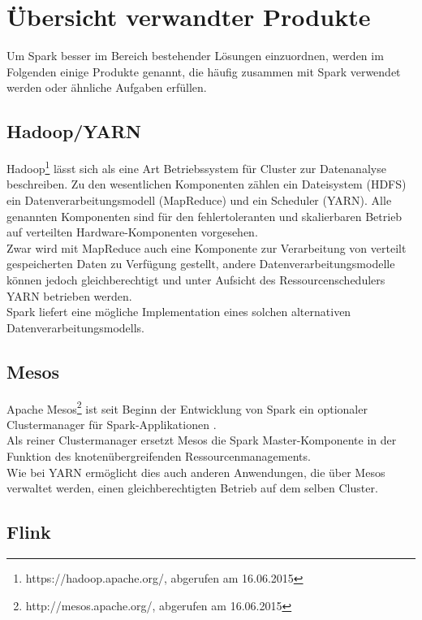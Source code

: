 \section{Übersicht verwandter Produkte}
Um Spark besser im Bereich bestehender Lösungen einzuordnen, werden im Folgenden einige Produkte genannt, die häufig zusammen mit Spark verwendet werden oder ähnliche Aufgaben erfüllen.

\subsection{Hadoop/YARN}

Hadoop\footnote{https://hadoop.apache.org/, abgerufen am 16.06.2015} lässt sich als eine Art Betriebssystem für Cluster zur Datenanalyse beschreiben. Zu den wesentlichen Komponenten zählen ein Dateisystem (HDFS) ein Datenverarbeitungsmodell (MapReduce) und ein Scheduler (YARN).
Alle genannten Komponenten sind für den fehlertoleranten und skalierbaren Betrieb auf verteilten Hardware-Komponenten vorgesehen.\\

Zwar wird mit MapReduce auch eine Komponente zur Verarbeitung von verteilt gespeicherten Daten zu Verfügung gestellt, andere Datenverarbeitungsmodelle können jedoch gleichberechtigt und unter Aufsicht des Ressourcenschedulers YARN betrieben werden.\\

Spark liefert eine mögliche Implementation eines solchen alternativen Datenverarbeitungsmodells.

\subsection{Mesos}

Apache Mesos\footnote{http://mesos.apache.org/, abgerufen am 16.06.2015} ist seit Beginn der Entwicklung von Spark ein optionaler Clustermanager für Spark-Applikationen \cite{Mat12}.\\

Als reiner Clustermanager ersetzt Mesos die Spark Master-Komponente in der Funktion des knotenübergreifenden Ressourcenmanagements.\\

Wie bei YARN ermöglicht dies auch anderen Anwendungen, die über Mesos verwaltet werden, einen gleichberechtigten Betrieb auf dem selben Cluster.\\

\subsection{Flink}


